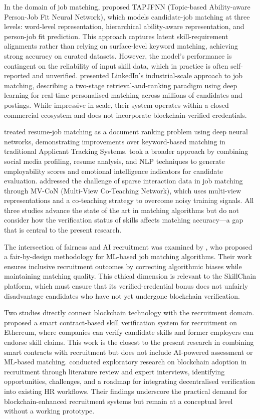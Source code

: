In the domain of job matching, \citet{Qin2020} proposed TAPJFNN (Topic-based Ability-aware Person-Job Fit Neural Network), which models candidate-job matching at three levels: word-level representation, hierarchical ability-aware representation, and person-job fit prediction. This approach captures latent skill-requirement alignments rather than relying on surface-level keyword matching, achieving strong accuracy on curated datasets. However, the model's performance is contingent on the reliability of input skill data, which in practice is often self-reported and unverified. \citet{Shen2024} presented LinkedIn's industrial-scale approach to job matching, describing a two-stage retrieval-and-ranking paradigm using deep learning for real-time personalised matching across millions of candidates and postings. While impressive in scale, their system operates within a closed commercial ecosystem and does not incorporate blockchain-verified credentials.

\citet{Rezaeipourfarsangi2023} treated resume-job matching as a document ranking problem using deep neural networks, demonstrating improvements over keyword-based matching in traditional Applicant Tracking Systems. \citet{Pendyala2022} took a broader approach by combining social media profiling, resume analysis, and NLP techniques to generate employability scores and emotional intelligence indicators for candidate evaluation. \citet{Bian2020} addressed the challenge of sparse interaction data in job matching through MV-CoN (Multi-View Co-Teaching Network), which uses multi-view representations and a co-teaching strategy to overcome noisy training signals. All three studies advance the state of the art in matching algorithms but do not consider how the verification status of skills affects matching accuracy---a gap that is central to the present research.

The intersection of fairness and AI recruitment was examined by \citet{Delecraz2022}, who proposed a fair-by-design methodology for ML-based job matching algorithms. Their work ensures inclusive recruitment outcomes by correcting algorithmic biases while maintaining matching quality. This ethical dimension is relevant to the SkillChain platform, which must ensure that its verified-credential bonus does not unfairly disadvantage candidates who have not yet undergone blockchain verification.

Two studies directly connect blockchain technology with the recruitment domain. \citet{Bedi2023} proposed a smart contract-based skill verification system for recruitment on Ethereum, where companies can verify candidate skills and former employers can endorse skill claims. This work is the closest to the present research in combining smart contracts with recruitment but does not include AI-powered assessment or ML-based matching. \citet{Kisi2022} conducted exploratory research on blockchain adoption in recruitment through literature review and expert interviews, identifying opportunities, challenges, and a roadmap for integrating decentralised verification into existing HR workflows. Their findings underscore the practical demand for blockchain-enhanced recruitment systems but remain at a conceptual level without a working prototype.

